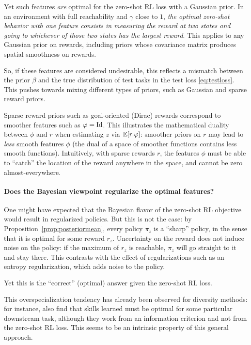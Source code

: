 \documentclass[11pt,a4paper]{article}
\begin{document}
Yet such features \emph{are} optimal for the zero-shot RL loss with a
Gaussian prior. In an environment with full reachability and
$\gamma$ close to $1$, \emph{the optimal zero-shot behavior with one
feature consists in measuring the reward at two states and going to
whichever of those two states has the largest reward}. This applies to
any Gaussian prior on rewards, including priors whose covariance matrix
produces spatial smoothness on rewards.

So, if these features are considered undesirable, this
reflects a mismatch between the prior $\beta$ and the true distribution
of test tasks in the test loss \eqref{eq:testloss}. This pushes towards
mixing different types of priors, such as Gaussian and sparse reward priors.

Sparse reward priors such as goal-oriented (Dirac) rewards
correspond to smoother features such as $\varphi=\operatorname{Id}$. This illustrates the
mathematical duality between $\phi$ and $r$ when estimating $z$ via
$\mathbb{E}[r.\varphi]$: smoother priors on $r$ may lead to \emph{less} smooth
features $\phi$ (the dual of a space of smoother functions contains less
smooth functions). Intuitively, with sparse rewards $r$, the features
$\phi$ must be able to ``catch'' the location of the reward anywhere in
the space, and cannot be zero almost-everywhere.

\paragraph{Does the Bayesian viewpoint regularize the optimal features?} One might
have expected that the Bayesian flavor of the zero-shot RL objective
would result in regularized policies. But this is not the case: by
Proposition~\ref{prop:posteriormean}, every policy $\pi_z$ is a ``sharp''
policy, in the sense that it is optimal for some reward $r_z$.
Uncertainty on the reward does not induce noise on the policy: if the
maximum of $r_z$ is reachable, $\pi_z$ will go straight to it and stay
there. This contrasts with the effect of regularizations such as an
entropy regularization, which adds noise to the policy.

Yet this is the ``correct'' (optimal) answer given the zero-shot RL loss.

This overspecialization tendency has already been observed for diversity
methods: for instance, \cite{eysenbach2021information} also find that
skills learned must be optimal for some particular downstream task,
although they work from an information criterion and not from the
zero-shot RL loss. This seems to be an intrinsic property of this general
approach.
\end{document}
